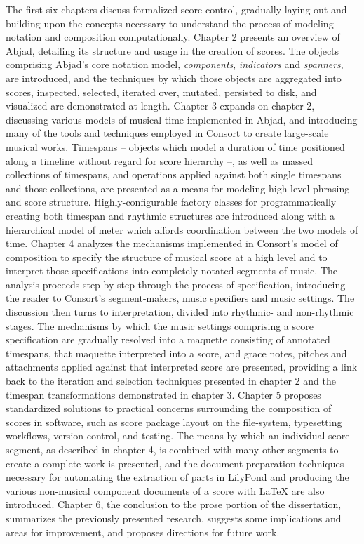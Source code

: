 The first six chapters discuss formalized score control, gradually laying out
and building upon the concepts necessary to understand the process of modeling
notation and composition computationally. Chapter 2 presents an overview of
Abjad, detailing its structure and usage in the creation of scores. The objects
comprising Abjad's core notation model, \emph{components}, \emph{indicators}
and \emph{spanners}, are introduced, and the techniques by which those objects
are aggregated into scores, inspected, selected, iterated over, mutated,
persisted to disk, and visualized are demonstrated at length. Chapter 3 expands
on chapter 2, discussing various models of musical time implemented in Abjad,
and introducing many of the tools and techniques employed in Consort to create
large-scale musical works. Timespans -- objects which model a duration of time
positioned along a timeline without regard for score hierarchy --, as well as
massed collections of timespans, and operations applied against both single
timespans and those collections, are presented as a means for modeling
high-level phrasing and score structure. Highly-configurable factory classes
for programmatically creating both timespan and rhythmic structures are
introduced along with a hierarchical model of meter which affords coordination
between the two models of time. Chapter 4 analyzes the mechanisms implemented
in Consort's model of composition to specify the structure of musical score at
a high level and to interpret those specifications into completely-notated
segments of music. The analysis proceeds step-by-step through the process of
specification, introducing the reader to Consort's segment-makers, music
specifiers and music settings. The discussion then turns to interpretation,
divided into rhythmic- and non-rhythmic stages. The mechanisms by which the
music settings comprising a score specification are gradually resolved into a
maquette consisting of annotated timespans, that maquette interpreted into a
score, and grace notes, pitches and attachments applied against that
interpreted score are presented, providing a link back to the iteration and
selection techniques presented in chapter 2 and the timespan transformations
demonstrated in chapter 3. Chapter 5 proposes standardized solutions to
practical concerns surrounding the composition of scores in software, such as
score package layout on the file-system, typesetting workflows, version
control, and testing. The means by which an individual score segment, as
described in chapter 4, is combined with many other segments to create a
complete work is presented, and the document preparation techniques necessary
for automating the extraction of parts in LilyPond and producing the various
non-musical component documents of a score with \LaTeX{} are also introduced.
Chapter 6, the conclusion to the prose portion of the dissertation, summarizes
the previously presented research, suggests some implications and areas for
improvement, and proposes directions for future work.

